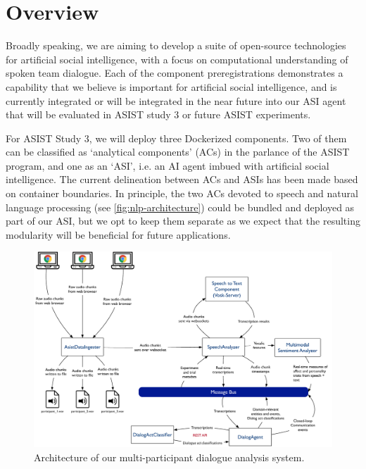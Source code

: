 \section{Overview}

Broadly speaking, we are aiming to develop a suite of open-source technologies
for artificial social intelligence, with a focus on computational understanding
of spoken team dialogue. Each of the component preregistrations demonstrates a
capability that we believe is important for artificial social intelligence, and
is currently integrated or will be integrated in the near future into our ASI
agent that will be evaluated in ASIST study 3 or future ASIST experiments.

For ASIST Study 3, we will deploy three Dockerized components. Two of them can
be classified as `analytical components' (ACs) in the parlance of the ASIST
program, and one as an `ASI', i.e. an AI agent imbued with artificial social
intelligence. The current delineation between ACs and ASIs has been made based
on container boundaries. In principle, the two ACs devoted to speech and
natural language processing (see \autoref{fig:nlp-architecture}) could be
bundled and deployed as part of our ASI, but we opt to keep them separate as we
expect that the resulting modularity will be beneficial for future
applications.

\begin{figure}
    \centering
    \includegraphics[width=6.5in]{images/nlp_architecture}
    \caption{Architecture of our multi-participant dialogue analysis system.}
    \label{fig:nlp-architecture}
\end{figure}


